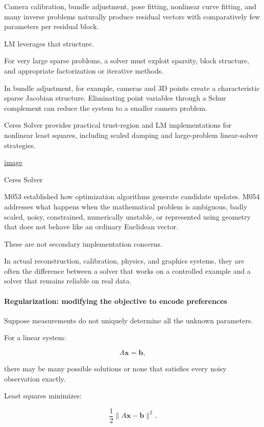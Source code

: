 Camera calibration, bundle adjustment, pose fitting, nonlinear curve fitting, and many inverse problems naturally produce residual vectors with comparatively few parameters per residual block.

LM leverages that structure.

For very large sparse problems, a solver must exploit sparsity, block structure, and appropriate factorization or iterative methods.

In bundle adjustment, for example, cameras and 3D points create a characteristic sparse Jacobian structure. Eliminating point variables through a Schur complement can reduce the system to a smaller camera problem.

Ceres Solver provides practical trust-region and LM implementations for nonlinear least squares, including scaled damping and large-problem linear-solver strategies. 

\href{https://www.google.com/s2/favicons?domain=https://ceres-solver.readthedocs.io&sz=32}{image}

Ceres Solver

M053 established how optimization algorithms generate candidate updates. M054 addresses what happens when the mathematical problem is ambiguous, badly scaled, noisy, constrained, numerically unstable, or represented using geometry that does not behave like an ordinary Euclidean vector.

These are not secondary implementation concerns.

In actual reconstruction, calibration, physics, and graphics systems, they are often the difference between a solver that works on a controlled example and a solver that remains reliable on real data.

\paragraph{Regularization: modifying the objective to encode preferences}\label{regularization-modifying-the-objective-to-encode-preferences}

Suppose measurements do not uniquely determine all the unknown parameters.

For a linear system:

\[
A\mathbf x=\mathbf b,
\]

there may be many possible solutions or none that satisfies every noisy observation exactly.

Least squares minimizes:

\[
\frac12\|A\mathbf x-\mathbf b\|^2.
\]


